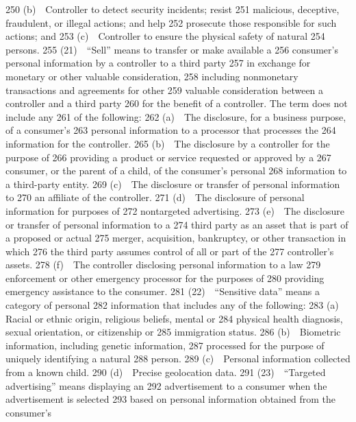   250         (b) Controller to detect security incidents; resist
  251  malicious, deceptive, fraudulent, or illegal actions; and help
  252  prosecute those responsible for such actions; and
  253         (c) Controller to ensure the physical safety of natural
  254  persons.
  255         (21) “Sell” means to transfer or make available a
  256  consumer’s personal information by a controller to a third party
  257  in exchange for monetary or other valuable consideration,
  258  including nonmonetary transactions and agreements for other
  259  valuable consideration between a controller and a third party
  260  for the benefit of a controller. The term does not include any
  261  of the following:
  262         (a) The disclosure, for a business purpose, of a consumer’s
  263  personal information to a processor that processes the
  264  information for the controller.
  265         (b) The disclosure by a controller for the purpose of
  266  providing a product or service requested or approved by a
  267  consumer, or the parent of a child, of the consumer’s personal
  268  information to a third-party entity.
  269         (c) The disclosure or transfer of personal information to
  270  an affiliate of the controller.
  271         (d) The disclosure of personal information for purposes of
  272  nontargeted advertising.
  273         (e) The disclosure or transfer of personal information to a
  274  third party as an asset that is part of a proposed or actual
  275  merger, acquisition, bankruptcy, or other transaction in which
  276  the third party assumes control of all or part of the
  277  controller’s assets.
  278         (f) The controller disclosing personal information to a law
  279  enforcement or other emergency processor for the purposes of
  280  providing emergency assistance to the consumer.
  281         (22) “Sensitive data” means a category of personal
  282  information that includes any of the following:
  283         (a) Racial or ethnic origin, religious beliefs, mental or
  284  physical health diagnosis, sexual orientation, or citizenship or
  285  immigration status.
  286         (b) Biometric information, including genetic information,
  287  processed for the purpose of uniquely identifying a natural
  288  person.
  289         (c) Personal information collected from a known child.
  290         (d) Precise geolocation data.
  291         (23) “Targeted advertising” means displaying an
  292  advertisement to a consumer when the advertisement is selected
  293  based on personal information obtained from the consumer’s
